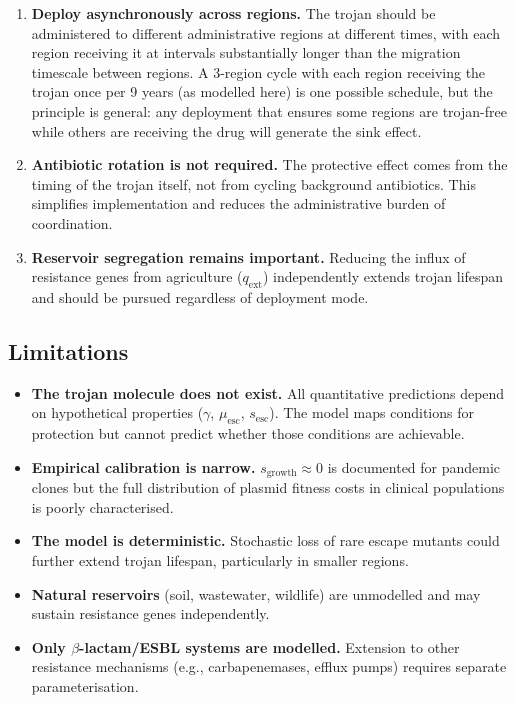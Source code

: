 \documentclass[12pt,a4paper]{article}
\begin{document}
\begin{enumerate}
    \item \textbf{Deploy asynchronously across regions.} The trojan should be administered to different administrative regions at different times, with each region receiving it at intervals substantially longer than the migration timescale between regions. A 3-region cycle with each region receiving the trojan once per 9 years (as modelled here) is one possible schedule, but the principle is general: any deployment that ensures some regions are trojan-free while others are receiving the drug will generate the sink effect.
    \item \textbf{Antibiotic rotation is not required.} The protective effect comes from the timing of the trojan itself, not from cycling background antibiotics. This simplifies implementation and reduces the administrative burden of coordination.
    \item \textbf{Reservoir segregation remains important.} Reducing the influx of resistance genes from agriculture ($q_{\text{ext}}$) independently extends trojan lifespan and should be pursued regardless of deployment mode.
\end{enumerate}

\subsection{Limitations}

\begin{itemize}
    \item \textbf{The trojan molecule does not exist.} All quantitative predictions depend on hypothetical properties ($\gamma$, $\mu_{\text{esc}}$, $s_{\text{esc}}$). The model maps conditions for protection but cannot predict whether those conditions are achievable.
    \item \textbf{Empirical calibration is narrow.} $s_{\text{growth}} \approx 0$ is documented for pandemic clones but the full distribution of plasmid fitness costs in clinical populations is poorly characterised.
    \item \textbf{The model is deterministic.} Stochastic loss of rare escape mutants could further extend trojan lifespan, particularly in smaller regions.
    \item \textbf{Natural reservoirs} (soil, wastewater, wildlife) are unmodelled and may sustain resistance genes independently.
    \item \textbf{Only $\beta$-lactam/ESBL systems are modelled.} Extension to other resistance mechanisms (e.g., carbapenemases, efflux pumps) requires separate parameterisation.
\end{itemize}
\end{document}
